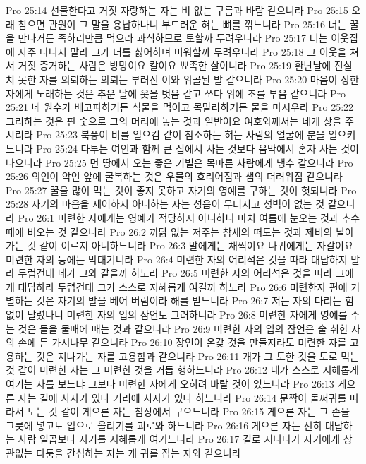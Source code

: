 Pro 25:14  선물한다고 거짓 자랑하는 자는 비 없는 구름과 바람 같으니라
Pro 25:15  오래 참으면 관원이 그 말을 용납하나니 부드러운 혀는 뼈를 꺾느니라
Pro 25:16  너는 꿀을 만나거든 족하리만큼 먹으라 과식하므로 토할까 두려우니라
Pro 25:17  너는 이웃집에 자주 다니지 말라 그가 너를 싫어하며 미워할까 두려우니라
Pro 25:18  그 이웃을 쳐서 거짓 증거하는 사람은 방망이요 칼이요 뾰족한 살이니라
Pro 25:19  환난날에 진실치 못한 자를 의뢰하는 의뢰는 부러진 이와 위골된 발 같으니라
Pro 25:20  마음이 상한 자에게 노래하는 것은 추운 날에 옷을 벗음 같고 쏘다 위에 초를 부음 같으니라
Pro 25:21  네 원수가 배고파하거든 식물을 먹이고 목말라하거든 물을 마시우라
Pro 25:22  그리하는 것은 핀 숯으로 그의 머리에 놓는 것과 일반이요 여호와께서는 네게 상을 주시리라
Pro 25:23  북풍이 비를 일으킴 같이 참소하는 혀는 사람의 얼굴에 분을 일으키느니라
Pro 25:24  다투는 여인과 함께 큰 집에서 사는 것보다 움막에서 혼자 사는 것이 나으니라
Pro 25:25  먼 땅에서 오는 좋은 기별은 목마른 사람에게 냉수 같으니라
Pro 25:26  의인이 악인 앞에 굴복하는 것은 우물의 흐리어짐과 샘의 더러워짐 같으니라
Pro 25:27  꿀을 많이 먹는 것이 좋지 못하고 자기의 영예를 구하는 것이 헛되니라
Pro 25:28  자기의 마음을 제어하지 아니하는 자는 성읍이 무너지고 성벽이 없는 것 같으니라
Pro 26:1  미련한 자에게는 영예가 적당하지 아니하니 마치 여름에 눈오는 것과 추수 때에 비오는 것 같으니라
Pro 26:2  까닭 없는 저주는 참새의 떠도는 것과 제비의 날아가는 것 같이 이르지 아니하느니라
Pro 26:3  말에게는 채찍이요 나귀에게는 자갈이요 미련한 자의 등에는 막대기니라
Pro 26:4  미련한 자의 어리석은 것을 따라 대답하지 말라 두렵건대 네가 그와 같을까 하노라
Pro 26:5  미련한 자의 어리석은 것을 따라 그에게 대답하라 두렵건대 그가 스스로 지혜롭게 여길까 하노라
Pro 26:6  미련한자 편에 기별하는 것은 자기의 발을 베어 버림이라 해를 받느니라
Pro 26:7  저는 자의 다리는 힘 없이 달렸나니 미련한 자의 입의 잠언도 그러하니라
Pro 26:8  미련한 자에게 영예를 주는 것은 돌을 물매에 매는 것과 같으니라
Pro 26:9  미련한 자의 입의 잠언은 술 취한 자의 손에 든 가시나무 같으니라
Pro 26:10  장인이 온갖 것을 만들지라도 미련한 자를 고용하는 것은 지나가는 자를 고용함과 같으니라
Pro 26:11  개가 그 토한 것을 도로 먹는 것 같이 미련한 자는 그 미련한 것을 거듭 행하느니라
Pro 26:12  네가 스스로 지혜롭게 여기는 자를 보느냐 그보다 미련한 자에게 오히려 바랄 것이 있느니라
Pro 26:13  게으른 자는 길에 사자가 있다 거리에 사자가 있다 하느니라
Pro 26:14  문짝이 돌쩌귀를 따라서 도는 것 같이 게으른 자는 침상에서 구으느니라
Pro 26:15  게으른 자는 그 손을 그릇에 넣고도 입으로 올리기를 괴로와 하느니라
Pro 26:16  게으른 자는 선히 대답하는 사람 일곱보다 자기를 지혜롭게 여기느니라
Pro 26:17  길로 지나다가 자기에게 상관없는 다툼을 간섭하는 자는 개 귀를 잡는 자와 같으니라
